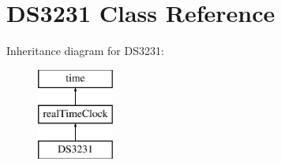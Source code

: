 \hypertarget{class_d_s3231}{}\section{D\+S3231 Class Reference}
\label{class_d_s3231}
Inheritance diagram for D\+S3231\+:\begin{figure}[H]
\begin{center}
\leavevmode
\includegraphics[height=3.000000cm]{class_d_s3231}
\end{center}
\end{figure}
